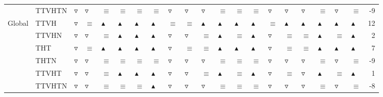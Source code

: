 \begin{table}
\begin{tabular}{llllllllllllllllllllr}
       & TTVHTN &  $\triangledown$ &   $\triangledown$ &          $\equiv$ &          $\equiv$ &          $\equiv$ &          $\equiv$ &   $\triangledown$ &   $\triangledown$ &   $\triangledown$ &          $\equiv$ &          $\equiv$ &          $\equiv$ &   $\triangledown$ &   $\triangledown$ &   $\triangledown$ &          $\equiv$ &   $\triangledown$ &          $\equiv$ &               -9 \\
Global & TTVH &  $\triangledown$ &          $\equiv$ &  $\blacktriangle$ &  $\blacktriangle$ &  $\blacktriangle$ &  $\blacktriangle$ &          $\equiv$ &          $\equiv$ &  $\blacktriangle$ &  $\blacktriangle$ &  $\blacktriangle$ &  $\blacktriangle$ &          $\equiv$ &  $\blacktriangle$ &  $\blacktriangle$ &  $\blacktriangle$ &  $\blacktriangle$ &  $\blacktriangle$ &               12 \\
       & TTVHN &  $\triangledown$ &   $\triangledown$ &          $\equiv$ &  $\blacktriangle$ &  $\blacktriangle$ &  $\blacktriangle$ &   $\triangledown$ &   $\triangledown$ &          $\equiv$ &  $\blacktriangle$ &          $\equiv$ &  $\blacktriangle$ &   $\triangledown$ &          $\equiv$ &          $\equiv$ &  $\blacktriangle$ &          $\equiv$ &  $\blacktriangle$ &                2 \\
       & THT &  $\triangledown$ &          $\equiv$ &  $\blacktriangle$ &  $\blacktriangle$ &  $\blacktriangle$ &  $\blacktriangle$ &   $\triangledown$ &          $\equiv$ &          $\equiv$ &  $\blacktriangle$ &  $\blacktriangle$ &  $\blacktriangle$ &   $\triangledown$ &          $\equiv$ &          $\equiv$ &  $\blacktriangle$ &  $\blacktriangle$ &  $\blacktriangle$ &                7 \\
       & THTN &  $\triangledown$ &   $\triangledown$ &          $\equiv$ &          $\equiv$ &          $\equiv$ &          $\equiv$ &   $\triangledown$ &   $\triangledown$ &   $\triangledown$ &          $\equiv$ &          $\equiv$ &          $\equiv$ &   $\triangledown$ &   $\triangledown$ &   $\triangledown$ &          $\equiv$ &   $\triangledown$ &          $\equiv$ &               -9 \\
       & TTVHT &  $\triangledown$ &   $\triangledown$ &          $\equiv$ &  $\blacktriangle$ &  $\blacktriangle$ &  $\blacktriangle$ &   $\triangledown$ &   $\triangledown$ &          $\equiv$ &  $\blacktriangle$ &          $\equiv$ &  $\blacktriangle$ &   $\triangledown$ &          $\equiv$ &   $\triangledown$ &  $\blacktriangle$ &          $\equiv$ &  $\blacktriangle$ &                1 \\
       & TTVHTN &  $\triangledown$ &   $\triangledown$ &          $\equiv$ &          $\equiv$ &          $\equiv$ &  $\blacktriangle$ &   $\triangledown$ &   $\triangledown$ &   $\triangledown$ &          $\equiv$ &          $\equiv$ &          $\equiv$ &   $\triangledown$ &   $\triangledown$ &   $\triangledown$ &          $\equiv$ &   $\triangledown$ &          $\equiv$ &               -8 \\
\bottomrule
\end{tabular}
\end{table}
